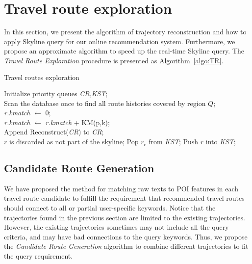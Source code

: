 \section{Travel route exploration} %
In this section, we present the algorithm of trajectory reconstruction and how to apply Skyline query for our online recommendation system. Furthermore, we propose an approximate algorithm to speed up the real-time Skyline query. The \textit{Travel Route Exploration} procedure is presented as Algorithm~\ref{algo:TR}.

\begin{algorithm}[h]
\label{algo:TR}
  \caption{Travel routes exploration}
  \small
  \Indm
  \Indp
  Initialize priority queues \textit{CR,KST};\\
  Scan the database once to find all route histories covered by region $Q$;\\
   {
    \textit{r.kmatch} $\leftarrow$ 0;\\
     {   
      \textit{r.kmatch} $\leftarrow$ \textit{r.kmatch} + KM(p,k);\\
    }
  }
  Append Reconstruct(\textit{CR}) to \textit{CR};\\
   {
     {
       {
        $r$ is discarded as not part of the skyline;
      }
       {
        Pop $r_c$ from \textit{KST};
      }
      Push $r$ into \textit{KST};
    }
  }
\end{algorithm} 

  

\subsection{Candidate Route Generation} \label{subsec:online.2}%
We have proposed the method for matching raw texts to POI features in each travel route candidate to fulfill the requirement that recommended travel routes should connect to all or partial user-specific keywords. Notice that the trajectories found in the previous section are limited to the existing trajectories. However, the existing trajectories sometimes may not include all the query criteria, and may have bad connections to the query keywords. Thus, we propose the \textit{Candidate Route Generation} algorithm to combine different trajectories to fit the query requirement.  

